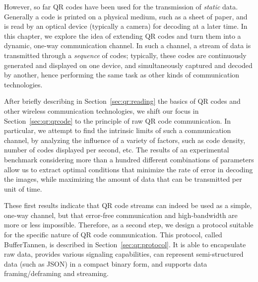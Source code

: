 However, so far QR codes have been used for the transmission of \emph{static} data. Generally a code is printed on a physical medium, such as a sheet of paper, and is read by an optical device (typically a camera) for decoding at a later time. In this chapter, we explore the idea of extending QR codes and turn them into a dynamic, one-way communication channel. In such a channel, a stream of data is transmitted through a \emph{sequence} of codes; typically, these codes are continuously generated and displayed on one device, and simultaneously captured and decoded by another, hence performing the same task as other kinds of communication technologies.

After briefly describing in Section~\ref{sec:qr:reading} the basics of QR codes and other wireless communication technologies, we shift our focus in Section~\ref{sec:qr:qrcode} to the principle of raw QR code communication. In particular, we attempt to find the intrinsic limits of such a communication channel, by analyzing the influence of a variety of factors, such as code density, number of codes displayed per second, etc. The results of an experimental benchmark considering more than a hundred different combinations of parameters allow us to extract optimal conditions that minimize the rate of error in decoding the images, while maximizing the amount of data that can be transmitted per unit of time.


These first results indicate that QR code streams can indeed be used as a simple, one-way channel, but that error-free communication and high-bandwidth are more or less impossible. Therefore, as a second step, we design a protocol suitable for the specific nature of QR code communication. This protocol, called BufferTannen, is described in Section~\ref{sec:qr:protocol}. It is able to encapsulate raw data, provides various signaling capabilities, can represent semi-structured data (such as JSON) in a compact binary form, and supports data framing/deframing and streaming.


